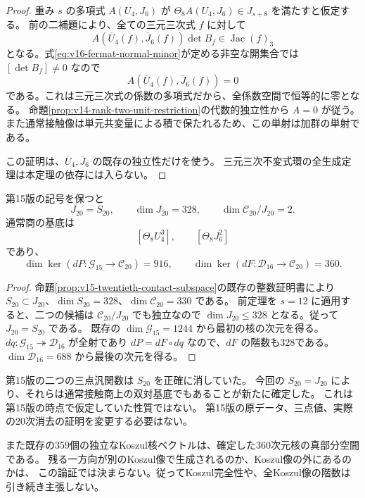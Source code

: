 \begin{proof}
重み $s$ の多項式 $A(U_4,J_6)$ が
$\Theta_8 A(U_4,J_6)\in J_{s+8}$ を満たすと仮定する。
前の二補題により、全ての三元三次式 $f$ に対して
\[
 A(\overline U_4(f),\overline J_6(f))\det B_f
      \in\operatorname{Jac}(f)_3
\]
となる。式\eqref{eq:v16-fermat-normal-minor}が定める非空な開集合では
$[\det B_f]\ne0$ なので
\[
 A(\overline U_4(f),\overline J_6(f))=0
\]
である。これは三元三次式の係数の多項式だから、全係数空間で恒等的に零となる。
命題\ref{prop:v14-rank-two-unit-restriction}の代数的独立性から $A=0$ が従う。
また通常接触像は単元共変量による積で保たれるため、この単射は加群の単射である。

この証明は、$\overline U_4,\overline J_6$ の既存の独立性だけを使う。
三元三次不変式環の全生成定理\cite{Fisher2008}は本定理の依存には入らない。
\end{proof}

\begin{corollary}[20次通常接触階数の確定]
\label{cor:v16-exact-twentieth-contact-rank}
第15版の記号を保つと
\begin{equation}\label{eq:v16-exact-twentieth-rank}
 J_{20}=S_{20},\qquad\dim J_{20}=328,
 \qquad\dim\mathcal C_{20}/J_{20}=2.
\end{equation}
通常商の基底は
\[
 [\Theta_8U_4^3],\qquad[\Theta_8J_6^2]
\]
であり、
\[
 \dim\ker(dP:\mathcal G_{15}\to\mathcal C_{20})=916,
 \qquad
 \dim\ker(dF:\mathcal D_{16}\to\mathcal C_{20})=360.
\]
\end{corollary}

\begin{proof}
命題\ref{prop:v15-twentieth-contact-subspace}の既存の整数証明書により
$S_{20}\subset J_{20}$、$\dim S_{20}=328$、$\dim\mathcal C_{20}=330$ である。
前定理を $s=12$ に適用すると、二つの候補は $\mathcal C_{20}/J_{20}$ でも独立なので
$\dim J_{20}\le328$ となる。従って $J_{20}=S_{20}$ である。
既存の $\dim\mathcal G_{15}=1244$ から最初の核の次元を得る。
$dq:\mathcal G_{15}\twoheadrightarrow\mathcal D_{16}$ が全射であり
$dP=dF\circ dq$ なので、$dF$ の階数も328である。
$\dim\mathcal D_{16}=688$ から最後の次元を得る。
\end{proof}

\begin{remark}[第15版の検出子とKoszul核の読み替え]
第15版の二つの三点汎関数は $S_{20}$ を正確に消していた。
今回の $S_{20}=J_{20}$ により、それらは通常接触商上の双対基底でもあることが新たに確定した。
これは第15版の時点で仮定していた性質ではない。
第15版の原データ、三点値、実際の20次消去の証明を変更する必要はない。

また既存の359個の独立なKoszul核ベクトルは、確定した360次元核の真部分空間である。
残る一方向が別のKoszul像で生成されるのか、Koszul像の外にあるのかは、
この論証では決まらない。従ってKoszul完全性や、全Koszul像の階数は引き続き主張しない。
\end{remark}

